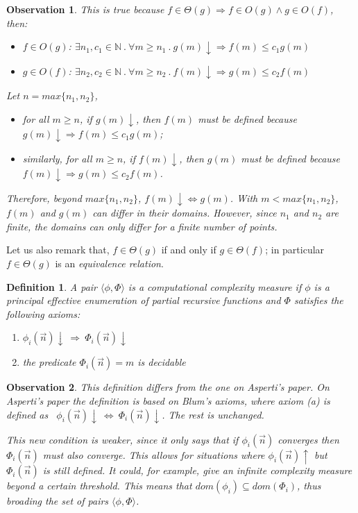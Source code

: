 \documentclass[10pt, a4paper, oneside, titlepage, draft]{article}
\newtheorem{definition}[shrd]{Definition}
\newtheorem{observation}{Observation}[shrd]
\begin{document}
\begin{observation}
    This is true because $f \in \Theta(g) \Rightarrow f \in O(g) \wedge g \in O(f)$, then:
    \begin{itemize}
        \item $f \in O(g) $: $ \exists n_1, c_1 \in \mathbb{N} \ . \ \forall m \ge n_1 \ . \ g(m)\downarrow \Rightarrow f(m) \le c_1g(m)$
        \item $g \in O(f) $: $ \exists n_2, c_2 \in \mathbb{N} \ . \ \forall m \ge n_2 \ . \ f(m)\downarrow \Rightarrow g(m) \le c_2f(m)$
    \end{itemize}
    Let $n = max\{n_1, n_2\}$,
    \begin{itemize}
        \item for all $m \ge n$, if $g(m)\downarrow$, then $f(m)$ must be defined because $ g(m)\downarrow \Rightarrow f(m) \le c_1g(m)$;
        \item similarly, for all $m \ge n$, if $f(m) \downarrow$, then $g(m)$ must be defined because $f(m) \downarrow \Rightarrow g(m) \le c_2f(m)$.
    \end{itemize}
    Therefore, beyond $max\{n_1, n_2\}$, $f(m) \downarrow \iff g(m)$. With $m < max\{n_1, n_2\}$, $f(m)$ and $g(m)$ can differ in their domains. However, since $n_1$ and $n_2$ are finite, the domains can only differ for a finite number of points.
\end{observation}

Let us also remark that, $f \in \Theta(g)$ if and only if $g \in \Theta(f)$; in particular $f \in \Theta(g)$ is an \emph{equivalence relation}.

\begin{definition}
    A pair $\langle \phi, \Phi \rangle$ is a \textit{computational complexity measure} if $\phi$ is a principal effective enumeration of partial recursive functions and $\Phi$ satisfies the following axioms: 
    \begin{enumerate}[label=(\alph*)]
        \item $ \phi_i(\vec{n})\downarrow \ \Rightarrow \ \Phi_i(\vec{n}) \downarrow $ 
        \item the predicate $ \Phi_i(\vec{n}) = m $ is decidable
    \end{enumerate}
\end{definition}


\begin{observation}
    This definition differs from the one on Asperti's paper. On Asperti's paper the definition is based on Blum's axioms, where axiom (a) is defined as \ $\phi_i(\vec{n})\downarrow \ \iff \ \Phi_i(\vec{n}) \downarrow$. The rest is unchanged.

    This new condition is weaker, since it only says that if $\phi_i(\vec{n})$ converges then $\Phi_i(\vec{n})$ must also converge. This allows for situations where $\phi_i(\vec{n})\uparrow$ but $\Phi_i(\vec{n})$ is still defined. It could, for example, give an infinite complexity measure beyond a certain threshold. 
    This means that $dom(\phi_i) \subseteq dom(\Phi_i)$, thus broading the set of pairs $\langle \phi, \Phi \rangle$.
\end{observation}
\end{document}
